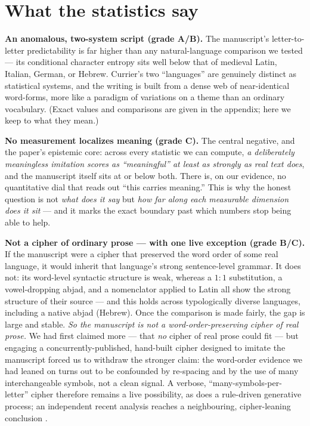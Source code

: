 \documentclass[11pt]{article}
\begin{document}
\section{What the statistics say}
\textbf{An anomalous, two-system script (grade A/B).} The manuscript's letter-to-letter
predictability is far higher than any natural-language comparison we tested --- its conditional
character entropy sits well below that of medieval Latin, Italian, German, or Hebrew. Currier's two
``languages'' are genuinely distinct as statistical systems, and the writing is built from a dense
web of near-identical word-forms, more like a paradigm of variations on a theme than an ordinary
vocabulary. (Exact values and comparisons are given in the appendix; here we keep to what they
mean.)

\textbf{No measurement localizes meaning (grade C).} The central negative, and the paper's
epistemic core: across every statistic we can compute, \emph{a deliberately meaningless imitation
scores as ``meaningful'' at least as strongly as real text does}, and the manuscript itself sits
at or below both. There is, on our evidence, no quantitative dial that reads out ``this carries
meaning.'' This is why the honest question is not \emph{what does it say} but \emph{how far along
each measurable dimension does it sit} --- and it marks the exact boundary past which numbers stop
being able to help.

\textbf{Not a cipher of ordinary prose --- with one live exception (grade B/C).} If the manuscript
were a cipher that preserved the word order of some real language, it would inherit that language's
strong sentence-level grammar. It does not: its word-level syntactic structure is weak, whereas a
$1{:}1$ substitution, a vowel-dropping abjad, and a nomenclator applied to Latin all show the
strong structure of their source --- and this holds across typologically diverse languages,
including a native abjad (Hebrew). Once the comparison is made fairly, the gap is large and stable.
\emph{So the manuscript is not a word-order-preserving cipher of real prose.} We had first claimed
more --- that \emph{no} cipher of real prose could fit --- but engaging a
concurrently-published, hand-built cipher designed to imitate the manuscript
\citep{greshko2025naibbe} forced us to withdraw the stronger claim: the word-order evidence we had
leaned on turns out to be confounded by re-spacing and by the use of many interchangeable symbols,
not a clean signal. A verbose, ``many-symbols-per-letter'' cipher therefore remains a live
possibility, as does a rule-driven generative process; an independent recent analysis reaches a
neighbouring, cipher-leaning conclusion \citep{parisel2026layered}.
\end{document}
